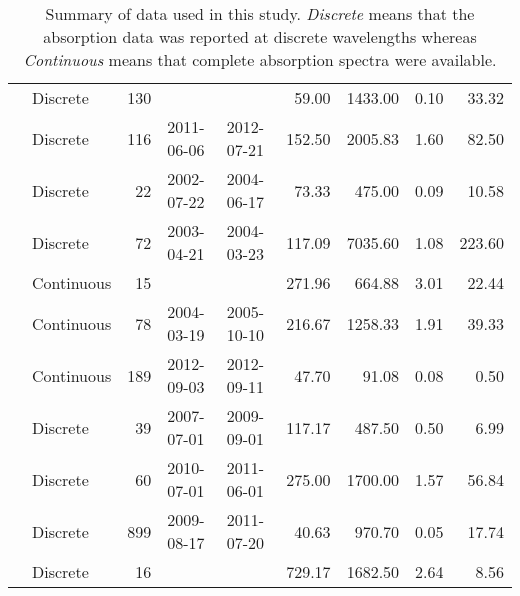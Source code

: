 \begin{table}[ht]
\begin{tabular}{llrllrrrr}
  \citet{Osburn2016} & Discrete & 130 &  &  & 59.00 & 1433.00 & 0.10 & 33.32 \\ 
  \citet{Polaris2012} & Discrete & 116 & 2011-06-06 & 2012-07-21 & 152.50 & 2005.83 & 1.60 & 82.50 \\ 
  \citet{Retamal2007} & Discrete &  22 & 2002-07-22 & 2004-06-17 & 73.33 & 475.00 & 0.09 & 10.58 \\ 
  \citet{Sickman2010} & Discrete &  72 & 2003-04-21 & 2004-03-23 & 117.09 & 7035.60 & 1.08 & 223.60 \\ 
  \citet{Stedmon2007a} & Continuous &  15 &  &  & 271.96 & 664.88 & 3.01 & 22.44 \\ 
  \citet{Stedmon2011} & Continuous &  78 & 2004-03-19 & 2005-10-10 & 216.67 & 1258.33 & 1.91 & 39.33 \\ 
  \citet{Stedmon2015} & Continuous & 189 & 2012-09-03 & 2012-09-11 & 47.70 & 91.08 & 0.08 & 0.50 \\ 
  \citet{Tehrani2013} & Discrete &  39 & 2007-07-01 & 2009-09-01 & 117.17 & 487.50 & 0.50 & 6.99 \\ 
  \citet{Wagner2015} & Discrete &  60 & 2010-07-01 & 2011-06-01 & 275.00 & 1700.00 & 1.57 & 56.84 \\ 
  \citet{Werdell2003} & Discrete & 899 & 2009-08-17 & 2011-07-20 & 40.63 & 970.70 & 0.05 & 17.74 \\ 
  \citet{Zhang2005} & Discrete &  16 &  &  & 729.17 & 1682.50 & 2.64 & 8.56 \\ 
   \hline
\end{tabular}
\endgroup
\caption{Summary of data used in this study. \textit{Discrete} means that the 
absorption data was reported at discrete wavelengths whereas 
\textit{Continuous} means that complete absorption spectra were available.} 
\end{table}
